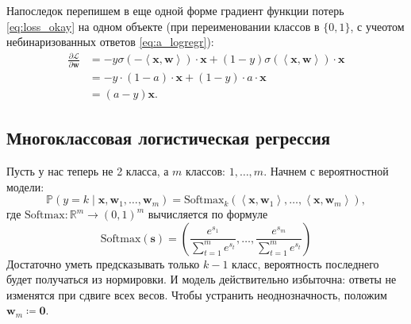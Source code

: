 \documentclass[12pt]{article}
\renewcommand{\vec}[1]{\mathbf{#1}}
\newcommand{\pder}[2][]{\frac{\partial#1}{\partial#2}}
\begin{document}
Напоследок перепишем в еще одной форме градиент функции потерь \eqref{eq:loss_okay} на одном объекте (при переименовании классов в $\{0, 1\}$, с учеотом небинаризованных ответов \eqref{eq:a_logregr}):
\begin{align}
    \pder[\mathcal{L}]{\vec{w}}&=-y \sigma\left(-\left<\vec{x},\vec{w}\right>\right)\cdot\vec{x} + \left( 1-y \right) \sigma\left(\left<\vec{x},\vec{w}\right>\right)\cdot\vec{x}\nonumber \\
    &=-y \cdot \left( 1-a \right)\cdot\vec{x} + \left( 1-y \right)\cdot a\cdot\vec{x}\nonumber\\
    &\label{eq:analogia1}= \left( a-y \right)\vec{x}.
\end{align}

\subsection{Многоклассовая логистическая регрессия}
Пусть у нас теперь не 2 класса, а $m$ классов: $1, \dots, m$. Начнем с вероятностной модели:
\begin{equation}
    \mathbb{P}(y=k\mid\vec{x}, \vec{w}_1,\dots,\vec{w}_{m})=\text{Softmax}_k
    \left(
        \left<\vec{x},\vec{w}_1\right>,
        \dots,
        \left<\vec{x},\vec{w}_m\right>
    \right),
\end{equation}
где $\text{Softmax}\colon\mathbb{R}^m\to \left( 0,1 \right)^{m}$ вычисляется по формуле
\begin{equation*}
    \text{Softmax}(\vec{s})=\left(\frac{e^{s_1}}{\sum_{t=1}^{m}e^{s_t}},\dots,\frac{e^{s_m}}{\sum_{t=1}^{m}e^{s_t}}\right)
\end{equation*}
Достаточно уметь предсказывать только $k-1$ класс, вероятность последнего будет получаться из нормировки. И модель действительно избыточна: ответы не изменятся при сдвиге всех весов. Чтобы устранить неоднозначность, положим $\vec{w}_m\coloneq\vec{0}$.
\end{document}
